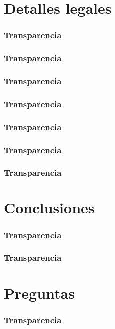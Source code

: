 \documentclass{beamer}
\begin{document}
    \section{Detalles legales}
    \begin{frame}
        \frametitle{Transparencia}
    \end{frame}
    \begin{frame}
        \frametitle{Transparencia}
    \end{frame}
    \begin{frame}
        \frametitle{Transparencia}
    \end{frame}
    \begin{frame}
        \frametitle{Transparencia}
    \end{frame}
    \begin{frame}
        \frametitle{Transparencia}
    \end{frame}
    \begin{frame}
        \frametitle{Transparencia}
    \end{frame}
    \begin{frame}
        \frametitle{Transparencia}
    \end{frame}
    \section{Conclusiones}
    \begin{frame}
        \frametitle{Transparencia}
    \end{frame}
    \begin{frame}
        \frametitle{Transparencia}
    \end{frame}
    \section{Preguntas}
    \begin{frame}
        \frametitle{Transparencia}
    \end{frame}
\end{document}
